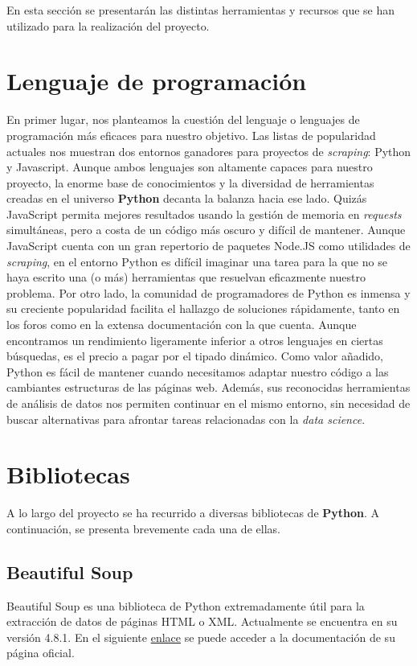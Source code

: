 
En esta sección se presentarán las distintas herramientas y recursos que se han utilizado para la realización del proyecto. 

\section{Lenguaje de programación}
En primer lugar, nos planteamos la cuestión del lenguaje o lenguajes de programación más eficaces para nuestro objetivo. Las listas de popularidad actuales nos muestran dos entornos ganadores para proyectos de \textit{scraping}: Python y Javascript. Aunque ambos lenguajes son altamente capaces para nuestro proyecto, la enorme base de conocimientos y la diversidad de herramientas creadas en el universo \textbf{Python} decanta la balanza hacia ese lado. Quizás JavaScript permita mejores resultados usando la gestión de memoria en \textit{requests} simultáneas, pero a costa de un código más oscuro y difícil de mantener. Aunque JavaScript cuenta con un gran repertorio de paquetes Node.JS como utilidades de \textit{scraping}, en el entorno Python es difícil imaginar una tarea para la que no se haya escrito una (o más) herramientas que resuelvan eficazmente nuestro problema. Por otro lado, la comunidad de programadores de Python es inmensa y su creciente popularidad facilita el hallazgo de soluciones rápidamente, tanto en los foros como en la extensa documentación con la que cuenta. Aunque encontramos un rendimiento ligeramente inferior a otros lenguajes en ciertas búsquedas, es el precio a pagar por el tipado dinámico. Como valor añadido, Python es fácil de mantener cuando necesitamos adaptar nuestro código a las cambiantes estructuras de las páginas web. Además, sus reconocidas herramientas de análisis de datos nos permiten continuar en el mismo entorno, sin necesidad de buscar alternativas para afrontar tareas relacionadas con la \textit{data science}.

\section{Bibliotecas}
A lo largo del proyecto se ha recurrido a diversas bibliotecas de \textbf{Python}. A continuación, se presenta brevemente cada una de ellas.

\subsection{Beautiful Soup}
Beautiful Soup es una biblioteca de Python extremadamente útil para la extracción de datos de páginas HTML o XML. Actualmente se encuentra en su versión 4.8.1. En el siguiente \href{https://beautiful-soup-4.readthedocs.io/en/latest/}{enlace} se puede acceder a la documentación de su página oficial. 

